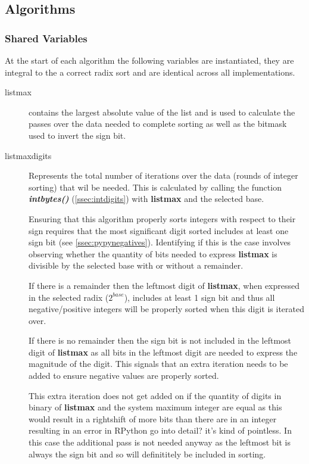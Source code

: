 \documentclass[12pt]{article}
\begin{document}
\pagebreak
\subsection{Algorithms}
\label{ssec:algorithms}
\subsubsection{Shared Variables}
At the start of each algorithm the following variables are instantiated, they are integral to the a correct radix sort and are identical across all implementations.
\begin{description}
	\item[listmax]contains the largest absolute value of the list and is used to calculate the passes over the data needed to complete sorting as well as the bitmask used to invert the sign bit.
 	\item[list\textunderscore max\textunderscore digits] Represents the total number of iterations over the data (rounds of integer sorting) that wil be needed. This is calculated by calling the function \textbf{\textit{int\textunderscore bytes()}} (\ref{ssec:intdigits}) with \textbf{list\textunderscore max} and the selected base.
	\par
	Ensuring that this algorithm properly sorts integers with respect to their sign requires that the most significant digit sorted includes at least one sign bit (see \ref{ssec:pypynegatives}). Identifying if this is the case involves observing whether the quantity of bits needed to express \textbf{list\textunderscore max} is divisible by the selected base with or without a remainder.
	\par 
	If there is a remainder then the leftmost digit of \textbf{list\textunderscore max}, when expressed in the selected radix ($2^{base}$), includes at least 1 sign bit and thus all negative/positive integers will be properly sorted when this digit is iterated over.
	\par
	If there is no remainder then the sign bit is not included in the leftmost digit of \textbf{list\textunderscore max} as all bits in the leftmost digit are needed to express the magnitude of the digit. This signals that an extra iteration needs to be added to ensure negative values are properly sorted.
	\par
	This extra iteration does not get added on if the quantity of digits in binary of \textbf{list\textunderscore max} and the system maximum integer are equal as this would result in a rightshift of more bits than there are in an integer resulting in an error in RPython {\color{red}go into detail? it's kind of pointless}. In this case the additional pass is not needed anyway as the leftmost bit is always the sign bit and so will definititely be included in sorting.

\end{description}
\end{document}
